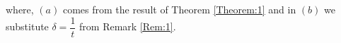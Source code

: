 \begin{customproof}{2}
where, $(a)$ comes from the result of Theorem \ref{Theorem:1} and in $(b)$ we substitute $\delta=\dfrac{1}{t}$ from Remark \ref{Rem:1}.

%
%
%

\end{customproof}

